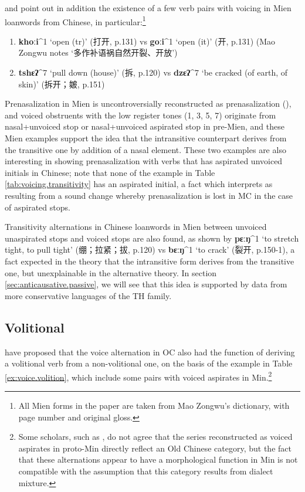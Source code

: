 \documentclass[oneside,a4paper,11pt]{article}
\newcommand{\ipa}[1]{\textbf{{\phon\mbox{#1}}}} %
\newcommand{\zh}[1]{{\cn #1}}
\newcommand{\mien}[5]{\ipa{#1}^{#2} `#3' (\zh{#4}, p.#5)}
\begin{document}
 \citet{downer73loanwords} and \citet{sagart03prenasalized} point out in addition the existence of 
a few verb pairs with voicing in Mien loanwords from Chinese, in particular:\footnote{All Mien forms in the paper are taken from Mao Zongwu's \citeyear{maozw92mien} dictionary, with page number and original gloss.} 

\begin{enumerate}
\item \mien{khoːi}{1}{open (tr)}{打开}{131}  vs \mien{goːi}{1}{open (it)}{开}{131}  (Mao Zongwu notes `\zh{多作补语祸自然开裂、开放}')
\item \mien{tshɛʔ}{7}{pull down (house)}{拆}{120} vs \mien{dzɛʔ}{7}{be cracked (of earth, of skin)}{拆开；皴}{151}
\end{enumerate}

Prenasalization in Mien is uncontroversially reconstructed as prenasalization (\citealt{ratliff10protohm}), and voiced obstruents with the low register tones (1, 3, 5, 7) originate from nasal+unvoiced stop or nasal+unvoiced aspirated stop in pre-Mien, and these Mien examples support the idea that the intransitive counterpart derives from the transitive one by addition of a nasal element. These two examples are also interesting in showing prenasalization with verbs that has aspirated unvoiced initials in Chinese; note that none of the example in Table \ref{tab:voicing.transitivity} has an aspirated initial, a fact which \citet{sagart03prenasalized} interprets as resulting from a sound change whereby prenasalization is lost in MC in the case of aspirated stops.

Transitivity alternations in Chinese loanwords in Mien between unvoiced unaspirated stops and voiced stops are also found, as shown by \mien{pɛːŋ}{1}{to stretch tight, to pull tight}{绷；拉紧；拔}{120} vs \mien{bɛːŋ}{1}{to crack}{裂开}{150-1}, a fact expected in the theory that the intransitive form derives from the transitive one, but unexplainable in the alternative theory. In section \ref{sec:anticausative.passive}, we will see that this idea is supported by data from more conservative languages of the TH family.

\subsection{Volitional}
\citet[55;131-5]{bs14oc} have proposed that the voice alternation in OC also had the function of deriving a volitional verb from a non-volitional one, on the basis of the example in Table \ref{ex:voice.volition}, which include some pairs with voiced aspirates in Min.\footnote{Some scholars, such as \citet{handel10min}, do not agree that the series reconstructed as voiced aspirates in proto-Min directly reflect an Old Chinese category, but the fact that these alternations appear to have a morphological function in Min is not compatible with the assumption that this category results from dialect mixture.  }
\end{document}
